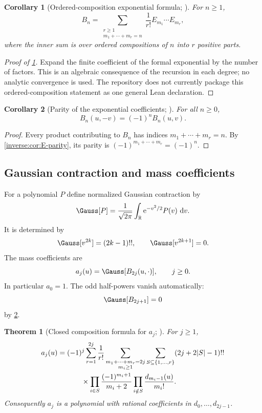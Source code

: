 \documentclass[11pt,oneside]{article}
\newtheorem{theorem}{Theorem}[section]
\newtheorem{corollary}[corollary]{Corollary}
\theoremstyle{definition}
\theoremstyle{remark}
\newcommand{\R}{\mathbb R}
\newcommand{\e}{\mathrm e}
\newcommand{\dd}{\,\mathrm d}
\begin{document}
\begin{corollary}[Ordered-composition exponential formula; \Derived]
\label{inverse:cor:exp-composition}
For \(n\geq1\),
\[
 B_n=\sum_{\substack{r\geq1\\m_1+\cdots+m_r=n}}
 \frac1{r!}E_{m_1}\cdots E_{m_r},
\]
where the inner sum is over ordered compositions of $n$ into $r$ positive
parts.
\end{corollary}

\begin{proof}[Proof of \cref{inverse:cor:exp-composition}]
Expand the finite coefficient of the formal exponential by the number of factors.  This is
an algebraic consequence of the recursion in each degree; no analytic convergence is used.
The repository does not currently package this ordered-composition statement as one general
Lean declaration.
\end{proof}

\begin{corollary}[Parity of the exponential coefficients; \Formalized]
\label{inverse:cor:B-parity}
For all $n\geq0$,
\[
 B_n(u,-v)=(-1)^nB_n(u,v).
\]
\end{corollary}

\begin{proof}
Every product contributing to $B_n$ has indices
$m_1+\cdots+m_r=n$.  By \cref{inverse:cor:E-parity}, its parity is
$(-1)^{m_1+\cdots+m_r}=(-1)^n$.
\end{proof}

\subsection{Gaussian contraction and mass coefficients}

For a polynomial $P$ define normalized Gaussian contraction by
\[
 \Gauss[P]
 =\frac1{\sqrt{2\pi}}\int_{\R}\e^{-v^2/2}P(v)\,\dd v.
\]
It is determined by
\begin{equation}
 \Gauss[v^{2k}]=(2k-1)!!,\qquad
 \Gauss[v^{2k+1}]=0. \label{inverse:eq:gaussian-moments}
\end{equation}
The mass coefficients are
\begin{equation}
 a_j(u)=\Gauss[B_{2j}(u,\cdot)],\qquad j\geq0.
 \label{inverse:eq:mass-coeff-definition}
\end{equation}
In particular $a_0=1$.  The odd half-powers vanish automatically:
\[
 \Gauss[B_{2j+1}]=0
\]
by \cref{inverse:cor:B-parity}.

\begin{theorem}[Closed composition formula for \(a_j\); \Derived]
\label{inverse:thm:mass-composition}
For $j\geq1$,
\begin{align}
 a_j(u)
 ={}&(-1)^j
 \sum_{r=1}^{2j}\frac1{r!}
 \sum_{\substack{m_1+\cdots+m_r=2j\\m_i\geq1}}
 \sum_{S\subseteq\{1,\dots,r\}}
 (2j+2|S|-1)!! \notag\\
 &\qquad{}\times
 \prod_{i\in S}\frac{(-1)^{m_i+1}}{m_i+2}
 \prod_{i\notin S}\frac{d_{m_i-1}(u)}{m_i!}.
 \label{inverse:eq:mass-composition}
\end{align}
Consequently $a_j$ is a polynomial with rational coefficients in
$d_0,\dots,d_{2j-1}$.
\end{theorem}
\end{document}

